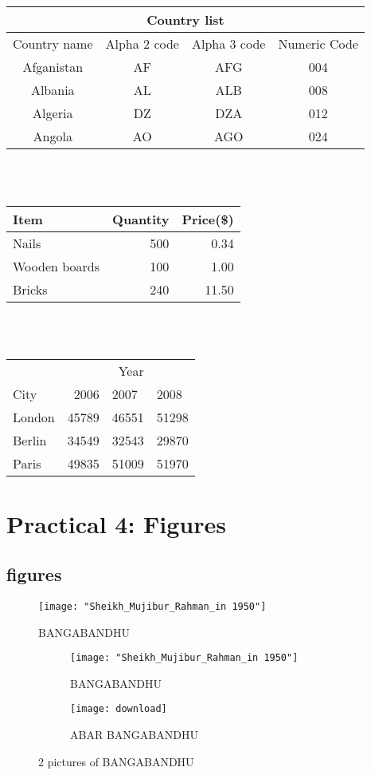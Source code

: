 \documentclass[a4paper,12pt]{report}
\begin{document}
\begin{tabular}{|c|c|c|c|}
\hline
\multicolumn{4}{|c|}{Country list} \\
\hline
Country name & Alpha 2 code& Alpha 3 code& Numeric Code\\
\hline
Afganistan & AF & AFG & 004\\
Albania & AL & ALB & 008\\
Algeria & DZ & DZA &012\\
Angola & AO & AGO & 024\\
\hline
\end{tabular}
\\
\\

\begin{tabular}{l|r|r}


Item &Quantity &Price(\$)  \\
\hline
Nails & 500 & 0.34 \\
Wooden boards & 100 & 1.00 \\
Bricks & 240 & 11.50\\
\end{tabular}
\\
\\

\begin{tabular}{l|rll}
\multicolumn{3}{r}{Year} \\
\cline{2-4}
City & 2006 & 2007 &2008\\
\hline
London & 45789 & 46551 & 51298\\
Berlin &34549 & 32543 & 29870\\
Paris & 49835 & 51009 & 51970\\
\end{tabular}


\chapter*{Practical 4: Figures}
\section{figures}

\begin{figure} [h!]
\centering
\texttt{[image: "Sheikh\_Mujibur\_Rahman\_in 1950"]}
\caption{BANGABANDHU}
\end{figure}


\begin{figure} []
\begin{subfigure}{0.4\textwidth}
\texttt{[image: "Sheikh\_Mujibur\_Rahman\_in 1950"]}
\caption{BANGABANDHU}
\label{fig:subimage1}
\end{subfigure}
\begin{subfigure}{0.4\textwidth}
\texttt{[image: download]}
\caption{ABAR BANGABANDHU}
\label{fig:subimage2}
\end{subfigure}

\caption{ 2 pictures of BANGABANDHU}
\label{fig:image2}
\end{figure}
\end{document}

